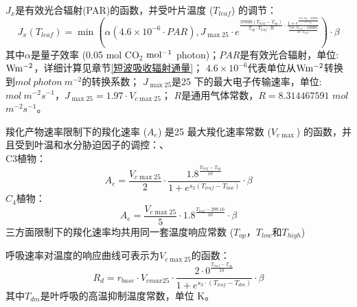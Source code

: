 $J_x$是有效光合辐射(PAR)的函数，并受叶片温度 ($T_{leaf}$) 的调节：
\begin{equation}
J_{x}\left(T_{{leaf }}\right)=\min \left(\alpha\left(4.6 \times 10^{-6} \cdot PAR\right), J_{\max 25}
 \cdot e^{\frac{37000\left(T_{{leaf }}-T_{o p}\right)}{T_{o p} \cdot T_{{leaf }} \cdot R} \cdot \frac{1+e^{\frac{710 \cdot T_{o p}-220000}
 {R \cdot T_{o p}}}}{\frac{710 \cdot T_{{leaf }}-220000}{R \cdot T_{{leaf }}}}}\right) \cdot \beta
\end{equation}
其中$\alpha$是量子效率 (0.05 mol CO$_2$ $\rm mol^{-1}$ photon)；$PAR$是有效光合辐射，单位: $\rm W m^{-2}$，详细计算见章节\ref{短波吸收辐射通量}；
$4.6 \times 10^{-6}$代表单位从$\rm W m^{-2}$转换到$mol\ photon\ m^{-2}$的转换系数；
$J_{\max 25}$是25 \textcelsius 下的最大电子传输速率，单位: $mol\ m^{-2}s^{-1}$，$J_{\max 25}=1.97 \cdot V_{c \max 25}$； 
$R$是通用气体常数，$R=8.314467591$ $mol$ $m^{-2}s^{-1}$。

羧化产物速率限制下的羧化速率 ($A_e$) 是25 \textcelsius 最大羧化速率常数 ($V_{c \max}$) 的函数，并且受到叶温和水分胁迫因子的调控：、\\
C3植物：\\
\begin{equation}\label{A_e_a}
A_e=\frac{V_{c \max 25}}{2} \cdot \frac{1.8^{\frac{T_{{leaf }}-T_{o p}}{10}}}{1+e^{s_{2}\left(T_{{leaf }}-T_{{low }}\right)}} \cdot \beta
\end{equation}
$C_4$植物：\\
\begin{equation}\label{A_e_b}
A_e=\frac{V_{c \max 25}}{5} \cdot 1.8^{\frac{T_{{leaf }}-298.16}{10}} \cdot \beta
\end{equation}
三方面限制下的羧化速率均共用同一套温度响应常数 ($T_{op}$，$T_{low}$和$T_{high}$)


呼吸速率对温度的响应曲线可表示为$V_{c \max25}$的函数：
\begin{equation}\label{R_d1}
R_{d}=r_{{base }} \cdot V_{cmax 25} \cdot \frac{2 \cdot 0^{\frac{T_{leaf}-T_{op}}{10}}}{1+e^{s_3 \cdot\left(T_{leaf}-T_{d m}\right)}} \cdot \beta
\end{equation}
其中$T_{dm}$是叶呼吸的高温抑制温度常数，单位 K。



